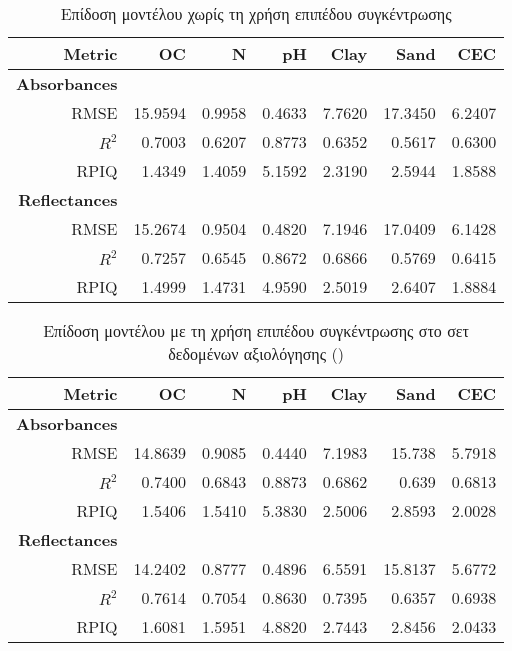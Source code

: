 \begin{table*}
    \centering
    \caption{Επίδοση μοντέλου χωρίς τη χρήση επιπέδου συγκέντρωσης}
    \begin{tabular}{@{}rrrrrrr@{}}\toprule
        Metric&OC&N&pH&Clay&Sand&CEC\\
        \midrule
        \textbf{Absorbances}&\multicolumn{6}{c}{}\\
        RMSE&15.9594&0.9958&0.4633&7.7620&17.3450&6.2407\\
        $R^2$&0.7003&0.6207&0.8773&0.6352&0.5617&0.6300\\
        RPIQ&1.4349&1.4059&5.1592&2.3190&2.5944&1.8588\\
        \midrule
        \textbf{Reflectances}&\multicolumn{6}{c}{}\\
        RMSE&15.2674&0.9504&0.4820&7.1946&17.0409&6.1428\\
        $R^2$&0.7257&0.6545&0.8672&0.6866&0.5769&0.6415\\
        RPIQ&1.4999&1.4731&4.9590&2.5019&2.6407&1.8884\\
        \bottomrule
    \end{tabular}
\end{table*}
\begin{table*}
    \centering
    \caption{Επίδοση μοντέλου με τη χρήση επιπέδου συγκέντρωσης στο σετ δεδομένων αξιολόγησης ()}
    \begin{tabular}{@{}rrrrrrr@{}}\toprule
        Metric&OC&N&pH&Clay&Sand&CEC\\
        \midrule
        \textbf{Absorbances}&\multicolumn{6}{c}{}\\
        RMSE&14.8639&0.9085&0.4440&7.1983&15.738&5.7918\\
        $R^2$&0.7400&0.6843&0.8873&0.6862&0.639&0.6813\\
        RPIQ&1.5406&1.5410&5.3830&2.5006&2.8593&2.0028\\
        \midrule
        \textbf{Reflectances}&\multicolumn{6}{c}{}\\
        RMSE&14.2402&0.8777&0.4896&6.5591&15.8137&5.6772\\
        $R^2$&0.7614&0.7054&0.8630&0.7395&0.6357&0.6938\\
        RPIQ&1.6081&1.5951&4.8820&2.7443&2.8456&2.0433\\
        \bottomrule
    \end{tabular}
\end{table*}

